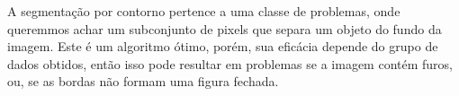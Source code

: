 \begin{question}
    A segmentação por contorno pertence a uma classe de problemas, onde queremmos achar 
    um subconjunto de pixels que separa um objeto do fundo da imagem. Este é um algoritmo 
    ótimo, porém, sua eficácia depende do grupo de dados obtidos, então isso pode resultar
    em problemas se a imagem contém furos, ou, se as bordas não formam uma figura fechada.
\end{question}